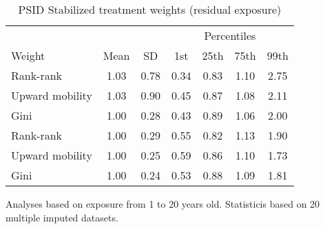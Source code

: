 \begin{table}[htp]
\centering
\footnotesize
\setlength{\tabcolsep}{10pt}
\renewcommand{\arraystretch}{1}
\begin{threeparttable}
\centering
\caption{PSID Stabilized treatment weights (residual exposure)} 
\label{tab:psid_r_ipt_weigths}
\begin{tabular}{lcccccc}
  \hline
\multicolumn{3}{c}{} & \multicolumn{4}{c}{Percentiles} \\ 
 \cmidrule{4-7} 
Weight & Mean & SD & 1st & 25th & 75th & 99th \\ 
  \hline
\quad Rank-rank & 1.03 & 0.78 & 0.34 & 0.83 & 1.10 & 2.75 \\ 
  \quad Upward mobility & 1.03 & 0.90 & 0.45 & 0.87 & 1.08 & 2.11 \\ 
  \quad Gini & 1.00 & 0.28 & 0.43 & 0.89 & 1.06 & 2.00 \\ 
  \quad Rank-rank & 1.00 & 0.29 & 0.55 & 0.82 & 1.13 & 1.90 \\ 
  \quad Upward mobility & 1.00 & 0.25 & 0.59 & 0.86 & 1.10 & 1.73 \\ 
  \quad Gini & 1.00 & 0.24 & 0.53 & 0.88 & 1.09 & 1.81 \\ 
   \hline
\end{tabular}
\begin{tablenotes}
\footnotesize
\item Analyses based on exposure from 1 to 20 years old. Statisticis based on  20 multiple imputed datasets.
\end{tablenotes}
\end{threeparttable}
\end{table}
